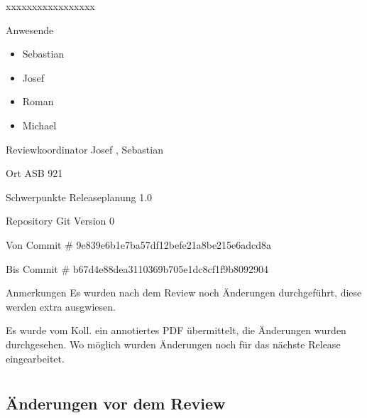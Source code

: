 \documentclass[
ngerman,
paper=a4,
asymmetric,
fontsize=10pt,
headings=small,
draft=false,
numbers=noenddot,
bibtotocnumbered,
footnotes=multiple,
]{scrreprt}
\begin{document}
\begin{labeling}[:]{xxxxxxxxxxxxxxxxx}
  \item[Anwesende] ~
  \begin{itemize}
    \item Sebastian 
    \item Josef 
    \item Roman 
    \item Michael 
  \end{itemize}
  \item[Reviewkoordinator] Josef , Sebastian 
  \item[Ort] ASB 921
  \item[Schwerpunkte] Releaseplanung 1.0
  \item[Repository] Git Version 0
  \item[Von Commit \#] 9e839e6b1e7ba57df12befe21a8be215e6adcd8a
  \item[Bis Commit \#] b67d4e88dea3110369b705e1dc8cf1f9b8092904
  \item[Anmerkungen] Es wurden nach dem Review noch Änderungen durchgeführt, diese werden extra ausgwiesen.   
  
  Es wurde vom Koll.  ein annotiertes PDF
  übermittelt, die Änderungen wurden durchgesehen. Wo
  möglich wurden Änderungen noch für das nächste Release
  eingearbeitet. 

\end{labeling}
\begin{WidePar}\small
\setcounter{tocdepth}{3}
\tableofcontents
\end{WidePar}





\chapter{\AASS}

\section{Änderungen vor dem Review}
\end{document}
